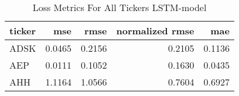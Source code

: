 \begin{table}
\caption{Loss Metrics For All Tickers LSTM-model}
\label{tab:loss_total_lstm}
\begin{tabular}{lrrrr}
\toprule
ticker & mse & rmse & normalized rmse & mae \\
\midrule
ADSK & 0.0465 & 0.2156 & 0.2105 & 0.1136 \\
AEP & 0.0111 & 0.1052 & 0.1630 & 0.0435 \\
AHH & 1.1164 & 1.0566 & 0.7604 & 0.6927 \\
\bottomrule
\end{tabular}
\end{table}
